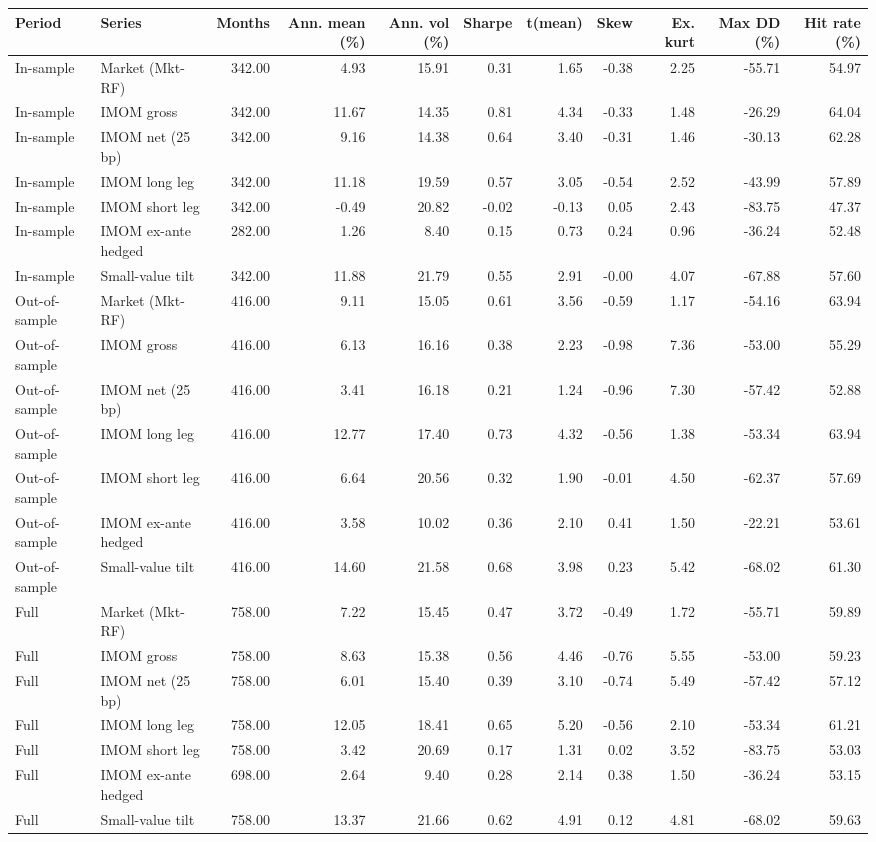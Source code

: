 \begin{tabular}{llrrrrrrrrr}
\toprule
Period & Series & Months & Ann. mean (\%) & Ann. vol (\%) & Sharpe & t(mean) & Skew & Ex. kurt & Max DD (\%) & Hit rate (\%) \\
\midrule
In-sample & Market (Mkt-RF) & 342.00 & 4.93 & 15.91 & 0.31 & 1.65 & -0.38 & 2.25 & -55.71 & 54.97 \\
In-sample & IMOM gross & 342.00 & 11.67 & 14.35 & 0.81 & 4.34 & -0.33 & 1.48 & -26.29 & 64.04 \\
In-sample & IMOM net (25 bp) & 342.00 & 9.16 & 14.38 & 0.64 & 3.40 & -0.31 & 1.46 & -30.13 & 62.28 \\
In-sample & IMOM long leg & 342.00 & 11.18 & 19.59 & 0.57 & 3.05 & -0.54 & 2.52 & -43.99 & 57.89 \\
In-sample & IMOM short leg & 342.00 & -0.49 & 20.82 & -0.02 & -0.13 & 0.05 & 2.43 & -83.75 & 47.37 \\
In-sample & IMOM ex-ante hedged & 282.00 & 1.26 & 8.40 & 0.15 & 0.73 & 0.24 & 0.96 & -36.24 & 52.48 \\
In-sample & Small-value tilt & 342.00 & 11.88 & 21.79 & 0.55 & 2.91 & -0.00 & 4.07 & -67.88 & 57.60 \\
Out-of-sample & Market (Mkt-RF) & 416.00 & 9.11 & 15.05 & 0.61 & 3.56 & -0.59 & 1.17 & -54.16 & 63.94 \\
Out-of-sample & IMOM gross & 416.00 & 6.13 & 16.16 & 0.38 & 2.23 & -0.98 & 7.36 & -53.00 & 55.29 \\
Out-of-sample & IMOM net (25 bp) & 416.00 & 3.41 & 16.18 & 0.21 & 1.24 & -0.96 & 7.30 & -57.42 & 52.88 \\
Out-of-sample & IMOM long leg & 416.00 & 12.77 & 17.40 & 0.73 & 4.32 & -0.56 & 1.38 & -53.34 & 63.94 \\
Out-of-sample & IMOM short leg & 416.00 & 6.64 & 20.56 & 0.32 & 1.90 & -0.01 & 4.50 & -62.37 & 57.69 \\
Out-of-sample & IMOM ex-ante hedged & 416.00 & 3.58 & 10.02 & 0.36 & 2.10 & 0.41 & 1.50 & -22.21 & 53.61 \\
Out-of-sample & Small-value tilt & 416.00 & 14.60 & 21.58 & 0.68 & 3.98 & 0.23 & 5.42 & -68.02 & 61.30 \\
Full & Market (Mkt-RF) & 758.00 & 7.22 & 15.45 & 0.47 & 3.72 & -0.49 & 1.72 & -55.71 & 59.89 \\
Full & IMOM gross & 758.00 & 8.63 & 15.38 & 0.56 & 4.46 & -0.76 & 5.55 & -53.00 & 59.23 \\
Full & IMOM net (25 bp) & 758.00 & 6.01 & 15.40 & 0.39 & 3.10 & -0.74 & 5.49 & -57.42 & 57.12 \\
Full & IMOM long leg & 758.00 & 12.05 & 18.41 & 0.65 & 5.20 & -0.56 & 2.10 & -53.34 & 61.21 \\
Full & IMOM short leg & 758.00 & 3.42 & 20.69 & 0.17 & 1.31 & 0.02 & 3.52 & -83.75 & 53.03 \\
Full & IMOM ex-ante hedged & 698.00 & 2.64 & 9.40 & 0.28 & 2.14 & 0.38 & 1.50 & -36.24 & 53.15 \\
Full & Small-value tilt & 758.00 & 13.37 & 21.66 & 0.62 & 4.91 & 0.12 & 4.81 & -68.02 & 59.63 \\
\bottomrule
\end{tabular}
